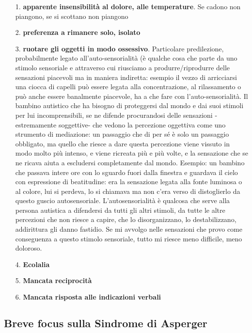\begin{itemize}
\item[1.]
  \textbf{apparente insensibilità al dolore, alle temperature}. Se
  cadono non piangono, se si scottano non piangono
\item[2.]
  \textbf{preferenza a rimanere solo, isolato}
\item[3.]
  \textbf{ruotare gli oggetti in modo ossessivo}. Particolare
  predilezione, probabilmente legato all'auto-sensorialità (è qualche
  cosa che parte da uno stimolo sensoriale e attraverso cui riusciamo a
  produrre/riprodurre delle sensazioni piacevoli ma in maniera
  indiretta: esempio il vezzo di arricciarsi una ciocca di capelli può
  essere legata alla concentrazione, al rilassamento o può anche essere
  banalmente piacevole, ha a che fare con l'auto-sensorialità. Il
  bambino autistico che ha bisogno di proteggersi dal mondo e dai suoi
  stimoli per lui incomprensibili, se ne difende procurandosi delle
  sensazioni -estremamente soggettive- che vedono la percezione
  oggettiva come uno strumento di mediazione: un passaggio che di per sé
  è solo un passaggio obbligato, ma quello che riesce a dare questa
  percezione viene vissuto in modo molto più intenso, e viene ricreata
  più e più volte, e la sensazione che se ne ricava aiuta a escludersi
  completamente dal mondo. Esempio: un bambino che passava intere ore
  con lo sguardo fuori dalla finestra e guardava il cielo con
  espressione di beatitudine: era la sensazione legata alla fonte
  luminosa o al colore, lui si perdeva, lo si chiamava ma non c'era
  verso di distoglierlo da questo guscio autosensoriale.
  L'autosensorialità è qualcosa che serve alla persona autistica a
  difendersi da tutti gli altri stimoli, da tutte le altre percezioni
  che non riesce a capire, che lo disorganizzano, lo destabilizzano,
  addirittura gli danno fastidio. Se mi avvolgo nelle sensazioni che
  provo come conseguenza a questo stimolo sensoriale, tutto mi riesce
  meno difficile, meno doloroso.
\item[4.]
  \textbf{Ecolalia}
\item[5.]
  \textbf{Mancata reciprocità}
\item[6.]
  \textbf{Mancata risposta alle indicazioni verbali}
\end{itemize}

\subsection{Breve focus sulla Sindrome di Asperger}

